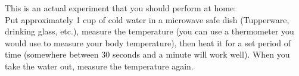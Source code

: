 \label{fnt1.2.1-5}







This is an actual experiment that you should perform at home:\\

\noindent Put approximately 1 cup of cold water in a microwave safe dish (Tupperware, drinking glass, etc.), measure the temperature (you can use a thermometer you would use to measure your body temperature), then heat it for a set period of time (somewhere between 30 seconds and a minute will work well). When you take the water out, measure the temperature again.

